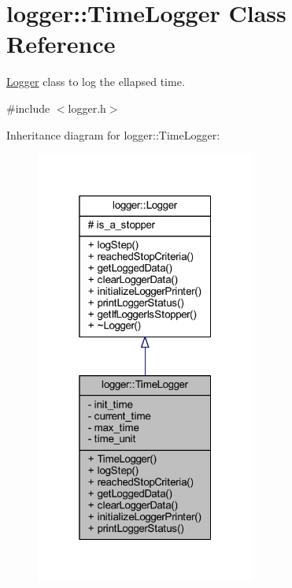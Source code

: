 \hypertarget{classlogger_1_1_time_logger}{}\section{logger\+:\+:Time\+Logger Class Reference}
\label{classlogger_1_1_time_logger}


\mbox{\hyperlink{classlogger_1_1_logger}{Logger}} class to log the ellapsed time.  




{\ttfamily \#include $<$logger.\+h$>$}



Inheritance diagram for logger\+:\+:Time\+Logger\+:\nopagebreak
\begin{figure}[H]
\begin{center}
\leavevmode
\includegraphics[width=205pt]{classlogger_1_1_time_logger__inherit__graph}
\end{center}
\end{figure}


